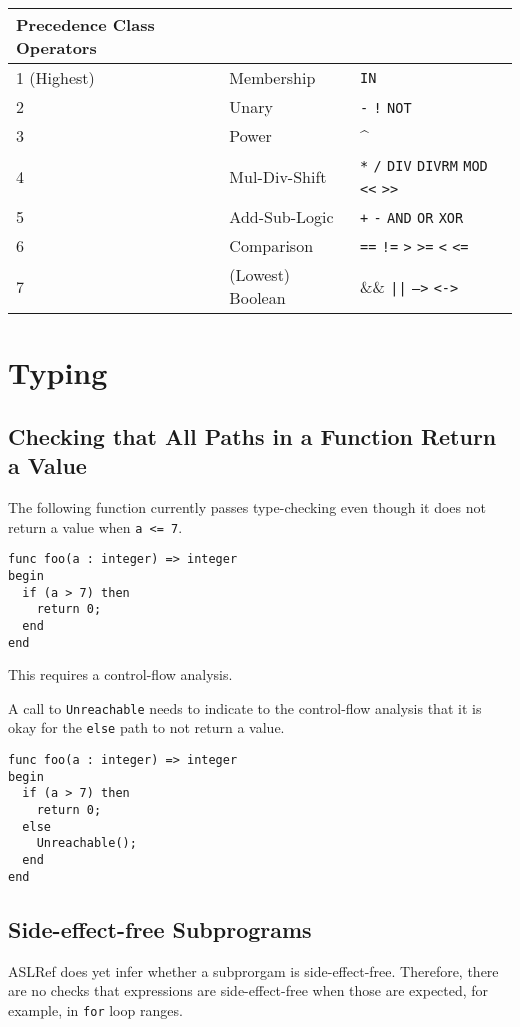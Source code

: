 \documentclass{book}
\begin{document}
\begin{center}
\begin{tabular}{lll}
  \hline
Precedence Class Operators\\
\hline
1 (Highest) & Membership & \texttt{IN}\\
2 & Unary & \texttt{-} \texttt{!} \texttt{NOT}\\
3 & Power & \textasciicircum\\
4 & Mul-Div-Shift & \texttt{*} \texttt{/} \texttt{DIV} \texttt{DIVRM} \texttt{MOD} \texttt{<<} \texttt{>>}\\
5 & Add-Sub-Logic & \texttt{+} \texttt{-} \texttt{AND} \texttt{OR} \texttt{XOR}\\
6 & Comparison & \texttt{==} \texttt{!=} \texttt{>} \texttt{>=} \texttt{<} \texttt{<=}\\
7 & (Lowest) Boolean & \&\& \texttt{||} \texttt{-->} \texttt{<->}\\
\hline
\end{tabular}
\end{center}

\section{Typing}

\subsection{Checking that All Paths in a Function Return a Value}
The following function currently passes type-checking even though
it does not return a value when \texttt{a <= 7}.
\begin{verbatim}
func foo(a : integer) => integer
begin
  if (a > 7) then
    return 0;
  end
end
\end{verbatim}
This requires a control-flow analysis.

A call to \texttt{Unreachable} needs to indicate to the control-flow
analysis that it is okay for the \texttt{else} path to not return a value.
\begin{verbatim}
func foo(a : integer) => integer
begin
  if (a > 7) then
    return 0;
  else
    Unreachable();
  end
end
\end{verbatim}

\subsection{Side-effect-free Subprograms}
ASLRef does yet infer whether a subprorgam is side-effect-free.
Therefore, there are no checks that expressions are side-effect-free when those are expected,
for example, in \texttt{for} loop ranges.
\end{document}
